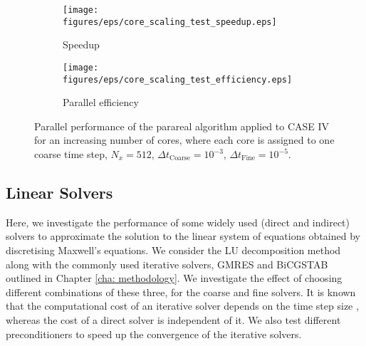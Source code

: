 \begin{figure}[h]
\centering
\begin{subfigure}{0.49\linewidth}
    \texttt{[image: figures/eps/core\_scaling\_test\_speedup.eps]}
    \caption{Speedup}
    \label{fig: core scaling speedup}
\end{subfigure}
\hfill
\begin{subfigure}{0.49\linewidth}
    \centering
    \texttt{[image: figures/eps/core\_scaling\_test\_efficiency.eps]}
    \caption{Parallel efficiency}
    \label{fig: core scaling efficiency}
\end{subfigure}
\caption{Parallel performance of the parareal algorithm applied to CASE IV for an increasing number of cores, where each core is assigned to one coarse time step, $N_x = 512$, $\Delta t_\mathrm{Coarse} = 10^{-3}$, $\Delta t_\mathrm{Fine} = 10^{-5}$.}
\label{fig: core scaling}
\end{figure}


\subsection{Linear Solvers}
\label{sec: linear solvers}
Here, we investigate the performance of some widely used (direct and indirect) solvers to approximate the solution to the linear system of equations obtained by discretising Maxwell's equations. 
We consider the LU decomposition method along with the commonly used iterative solvers, GMRES and BiCGSTAB outlined in Chapter \ref{cha: methodology}. We investigate the effect of choosing different combinations of these three, for the coarse and fine solvers. It is known that the computational cost of an iterative solver depends on the time step size \cite{einkemmer_adaptive_2018, hochbruck_exponential_1998}, whereas the cost of a direct solver is independent of it. We also test different preconditioners to speed up the convergence of the iterative solvers.

